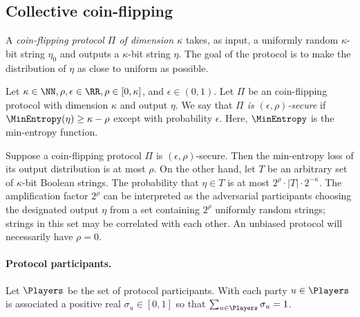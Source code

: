 
\newcommand{\FuncBeacon}{\mathcal{F}_\mathsf{beacon}}
\newcommand{\ProtocolBeacon}{\mathcal{\Pi}_\mathsf{beacon}}




\subsection{Collective coin-flipping}

    A \emph{coin-flipping protocol $\Pi$ of dimension $\kappa$} 
    takes, as input, a uniformly random $\kappa$-bit string $\eta_0$
    and outputs a $\kappa$-bit string $\eta$. 
    The goal of the protocol is to make the distribution of $\eta$ 
    as close to uniform as possible.
    
    \begin{definition}\label{def:coin-flipping-security}
        Let $\kappa \in \NN, \rho, \epsilon \in \RR, \rho \in [0, \kappa]$, and $\epsilon \in (0,1)$.
        Let $\Pi$ be an coin-flipping protocol with dimension $\kappa$ 
        and output $\eta$. 
        We say that \emph{$\Pi$ is $(\epsilon, \rho)$-secure} if 
        $\MinEntropy(\eta) \geq \kappa - \rho$ 
        except with probability $\epsilon$. 
        Here, $\MinEntropy$ is the min-entropy function.
    \end{definition}
    
    Suppose a coin-flipping protocol $\Pi$ is $(\epsilon, \rho)$-secure. 
    Then 
    the min-entropy loss of its output distribution is at most $\rho$. 
    On the other hand, let $T$ be an arbitrary set of $\kappa$-bit Boolean strings. 
    The probability that $\eta \in T$ is at most $2^\rho \cdot |T| \cdot 2^{-\kappa}$. 
    The amplification factor $2^\rho$ can be interpreted as 
    the adversarial participants 
    choosing the designated output $\eta$ from 
    a set containing $2^\rho$ uniformly random strings; 
    {\color{red} strings in this set may be correlated with each other}. 
    An unbiased protocol will necessarily have $\rho = 0$.


    \paragraph{Protocol participants.} 
    Let $\Players$ be the set of protocol participants. 
    With each party $u \in \Players$ is associated a positive real $\sigma_u \in [0, 1]$ 
    so that $\sum_{u \in \Players} \sigma_u = 1$. 


